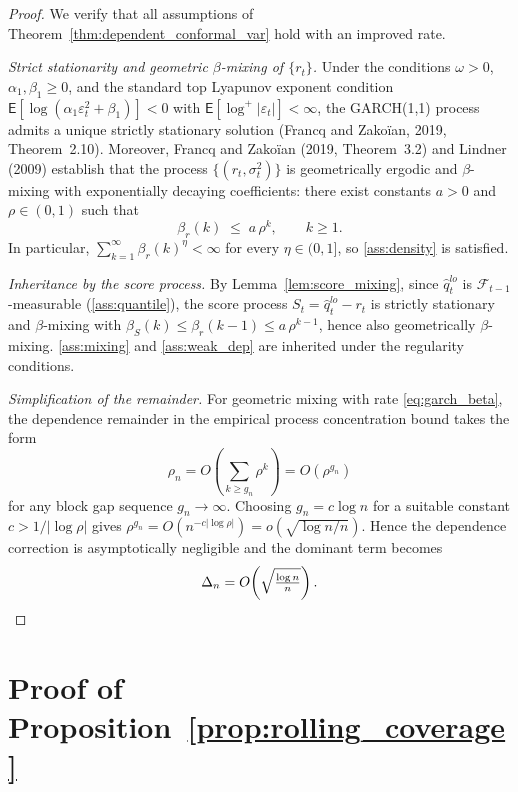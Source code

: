 \documentclass[11pt]{article}
\newcommand{\E}{\mathsf{E}}
\begin{document}
\begin{proof}
We verify that all assumptions of
Theorem~\ref{thm:dependent_conformal_var} hold with an improved
rate.

\textit{Strict stationarity and geometric $\beta$-mixing of
$\{r_t\}$.}\enspace
Under the conditions $\omega>0$, $\alpha_1,\beta_1\ge 0$, and the
standard top Lyapunov exponent condition
$\E[\log(\alpha_1\varepsilon_t^2+\beta_1)]<0$ with
$\E[\log^+|\varepsilon_t|]<\infty$, the GARCH(1,1) process admits
a unique strictly stationary solution (Francq and Zako\"{i}an,
2019, Theorem~2.10). Moreover,
Francq and Zako\"{i}an (2019, Theorem~3.2) and
Lindner (2009) establish that the process $\{(r_t,\sigma_t^2)\}$
is geometrically ergodic and $\beta$-mixing with exponentially
decaying coefficients: there exist constants $a>0$ and
$\rho\in(0,1)$ such that
\begin{equation}\label{eq:garch_beta}
\beta_r(k) \;\le\; a\,\rho^k,\qquad k\ge 1.
\end{equation}
In particular,
$\sum_{k=1}^\infty \beta_r(k)^\eta < \infty$ for every
$\eta\in(0,1]$, so \ref{ass:density} is satisfied.

\textit{Inheritance by the score process.}\enspace
By Lemma~\ref{lem:score_mixing}, since $\hat q_t^{lo}$ is
$\mathcal F_{t-1}$-measurable (\ref{ass:quantile}), the score
process $S_t = \hat q_t^{lo}-r_t$ is strictly stationary and
$\beta$-mixing with $\beta_S(k) \le \beta_r(k-1)\le a\,\rho^{k-1}$,
hence also geometrically $\beta$-mixing.
\ref{ass:mixing} and \ref{ass:weak_dep} are inherited under the
regularity conditions.

\textit{Simplification of the remainder.}\enspace
For geometric mixing with rate \eqref{eq:garch_beta}, the
dependence remainder in the empirical process concentration bound
takes the form
\[
\rho_n = O\!\left(\sum_{k\ge g_n}\rho^k\right) = O(\rho^{g_n})
\]
for any block gap sequence $g_n \to \infty$. Choosing
$g_n = c\log n$ for a suitable constant $c > 1/|\log \rho|$ gives
$\rho^{g_n} = O(n^{-c|\log\rho|}) = o(\sqrt{\log n / n})$. Hence
the dependence correction is asymptotically negligible and the
dominant term becomes
\[
\Delta_n = O\!\left(\sqrt{\tfrac{\log n}{n}}\right).
\qedhere
\]
\end{proof}

\section{Proof of Proposition~\ref{prop:rolling_coverage}}
\end{document}
